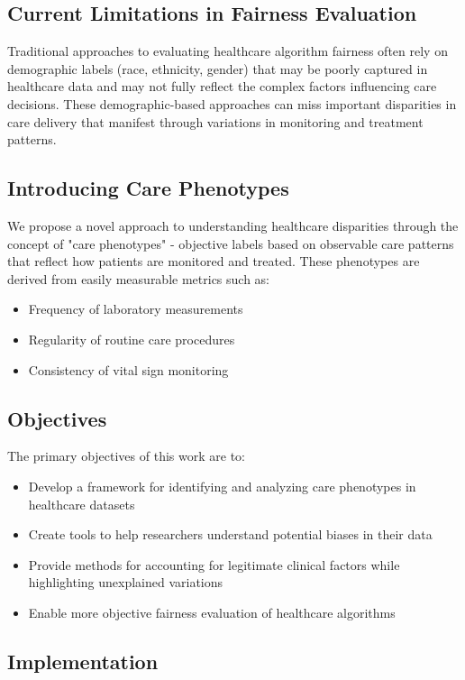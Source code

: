 \documentclass[12pt]{article}
\begin{document}
\subsection{Current Limitations in Fairness Evaluation}

Traditional approaches to evaluating healthcare algorithm fairness often rely on demographic labels (race, ethnicity, gender) that may be poorly captured in healthcare data and may not fully reflect the complex factors influencing care decisions. These demographic-based approaches can miss important disparities in care delivery that manifest through variations in monitoring and treatment patterns.

\subsection{Introducing Care Phenotypes}

We propose a novel approach to understanding healthcare disparities through the concept of "care phenotypes" - objective labels based on observable care patterns that reflect how patients are monitored and treated. These phenotypes are derived from easily measurable metrics such as:
\begin{itemize}
    \item Frequency of laboratory measurements
    \item Regularity of routine care procedures
    \item Consistency of vital sign monitoring
\end{itemize}

\subsection{Objectives}

The primary objectives of this work are to:
\begin{itemize}
    \item Develop a framework for identifying and analyzing care phenotypes in healthcare datasets
    \item Create tools to help researchers understand potential biases in their data
    \item Provide methods for accounting for legitimate clinical factors while highlighting unexplained variations
    \item Enable more objective fairness evaluation of healthcare algorithms
\end{itemize}

\subsection{Implementation}
\end{document}
